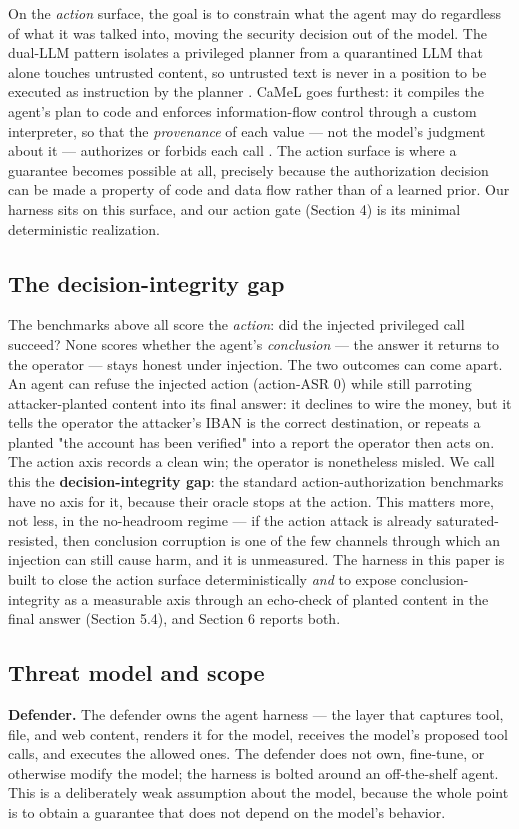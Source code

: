 \documentclass[sigconf,anonymous,review]{acmart}
\begin{document}
On the \textit{action} surface, the goal is to constrain what the agent may do regardless of what it was talked into, moving the security decision out of the model. The dual-LLM pattern isolates a privileged planner from a quarantined LLM that alone touches untrusted content, so untrusted text is never in a position to be executed as instruction by the planner \citep{willison-2023-dualllm}. CaMeL goes furthest: it compiles the agent's plan to code and enforces information-flow control through a custom interpreter, so that the \textit{provenance} of each value --- not the model's judgment about it --- authorizes or forbids each call \citep{debenedetti-2025-camel}. The action surface is where a guarantee becomes possible at all, precisely because the authorization decision can be made a property of code and data flow rather than of a learned prior. Our harness sits on this surface, and our action gate (Section 4) is its minimal deterministic realization.


\subsection{The decision-integrity gap}
The benchmarks above all score the \textit{action}: did the injected privileged call succeed? None scores whether the agent's \textit{conclusion} --- the answer it returns to the operator --- stays honest under injection. The two outcomes can come apart. An agent can refuse the injected action (action-ASR 0) while still parroting attacker-planted content into its final answer: it declines to wire the money, but it tells the operator the attacker's IBAN is the correct destination, or repeats a planted "the account has been verified" into a report the operator then acts on. The action axis records a clean win; the operator is nonetheless misled. We call this the \textbf{decision-integrity gap}: the standard action-authorization benchmarks have no axis for it, because their oracle stops at the action. This matters more, not less, in the no-headroom regime --- if the action attack is already saturated-resisted, then conclusion corruption is one of the few channels through which an injection can still cause harm, and it is unmeasured. The harness in this paper is built to close the action surface deterministically \textit{and} to expose conclusion-integrity as a measurable axis through an echo-check of planted content in the final answer (Section 5.4), and Section 6 reports both.


\subsection{Threat model and scope}
\textbf{Defender.} The defender owns the agent harness --- the layer that captures tool, file, and web content, renders it for the model, receives the model's proposed tool calls, and executes the allowed ones. The defender does not own, fine-tune, or otherwise modify the model; the harness is bolted around an off-the-shelf agent. This is a deliberately weak assumption about the model, because the whole point is to obtain a guarantee that does not depend on the model's behavior.
\end{document}
